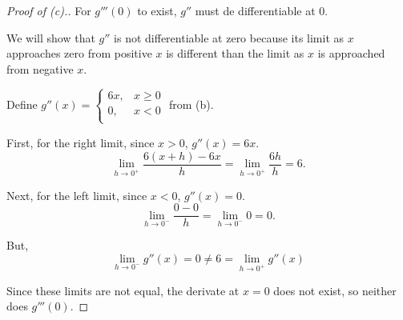 \documentclass[../hw3.tex]{subfiles}
\begin{document}
\begin{proof}[Proof of (c).]
    For $g'''(0)$ to exist, $g''$ must de differentiable at 0. 

    We will show that $g''$ is not differentiable at zero because its limit as $x$ approaches zero from positive $x$ is different than the limit as $x$ is approached from negative $x$. 
    
    Define $g''(x) = \begin{cases}
        6x, & x \geq 0 \\
        0, & x < 0 \\
    \end{cases}$ from (b).

    First, for the right limit, since $x>0$, $g''(x) = 6x$.
    \[\lim\limits_{h \to 0^+} \frac{6(x+h)-6x}{h} = \lim\limits_{h \to 0^+} \frac{6h}{h} = 6.\]

    Next, for the left limit, since $x<0$, $g''(x) = 0$.
    \[\lim\limits_{h \to 0^-} \frac{0-0}{h} = \lim\limits_{h \to 0^-} 0 = 0.\]

    But, \[\lim\limits_{h \to 0^-} g''(x) = 0 \neq 6 = \lim\limits_{h \to 0^+} g''(x)\]

    Since these limits are not equal, the derivate at $x=0$ does not exist, so neither does $g'''(0)$.
\end{proof}
\end{document}
